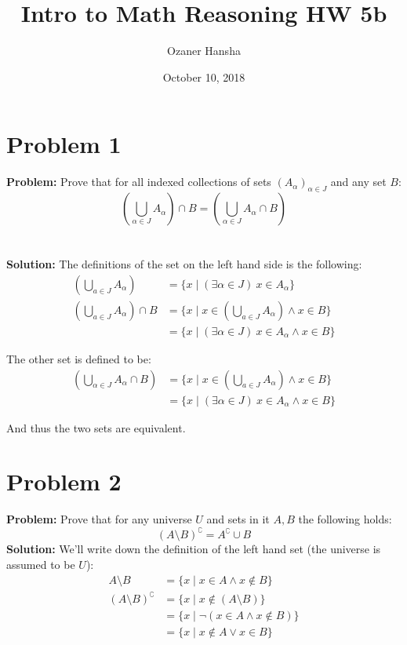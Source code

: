 \documentclass{article}
\begin{document}
\title{Intro to Math Reasoning HW 5b}
\author{Ozaner Hansha}
\date{October 10, 2018}
\maketitle

\section*{Problem 1}
\textbf{Problem:} Prove that for all indexed collections of sets $(A_\alpha)_{\alpha\in J}$ and any set $B$:
$$\left(\bigcup_{\alpha\in J} A_\alpha\right)\cap B=\left(\bigcup_{\alpha\in J} A_\alpha\cap B\right)$$
\\\\
\textbf{Solution:} The definitions of the set on the left hand side is the following:
\begin{align*}
  \left(\bigcup_{a\in J}A_\alpha\right)&=\{x\mid(\exists\alpha\in J)\ x\in A_\alpha\}\\
  \left(\bigcup_{a\in J}A_\alpha\right)\cap B&=\{x\mid x\in(\bigcup_{a\in J}A_\alpha)\wedge x\in B\}\\
  &=\{x\mid(\exists\alpha\in J)\ x\in A_\alpha\wedge x\in B\}
\end{align*}

The other set is defined to be:
\begin{align*}
  \left(\bigcup_{\alpha\in J} A_\alpha\cap B\right)&=\{x\mid x\in(\bigcup_{a\in J}A_\alpha)\wedge x\in B\}\\
  &=\{x\mid(\exists\alpha\in J)\ x\in A_\alpha\wedge x\in B\}
\end{align*}

And thus the two sets are equivalent.

\section*{Problem 2}
\textbf{Problem:} Prove that for any universe $U$ and sets in it $A,B$ the following holds:
$$(A\setminus B)^\complement = A^\complement\cup B$$
\textbf{Solution:} We'll write down the definition of the left hand set (the universe is assumed to be $U$):
\begin{align*}
  A\setminus B&=\{x\mid x\in A\wedge x\not\in B\}\\
  (A\setminus B)^\complement&=\{x\mid x\not\in (A\setminus B)\}\\
  &=\{x\mid \neg(x\in A\wedge x\not\in B)\}\\
  &=\{x\mid x\not\in A\vee x\in B\}\\
\end{align*}
\end{document}
